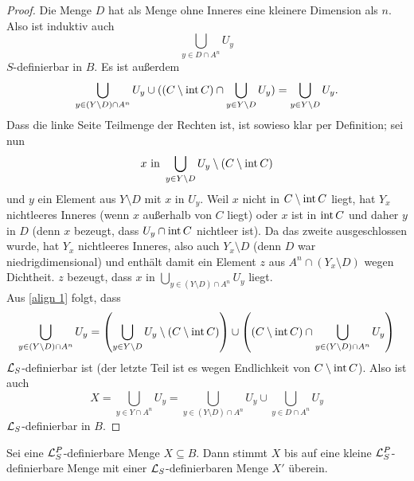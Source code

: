 \begin{proof}
	Die Menge $D$ hat als Menge ohne Inneres eine kleinere Dimension als $n$. Also ist induktiv auch $$\bigcup\limits_{y\in D\cap A^n}U_y$$ $S$-definierbar in $B$. Es ist außerdem
	\begin{align}\label{align 1}
	\bigcup\limits_{y\in (Y\setminus D)\cap A^n}U_y\cup((C\setminus\operatorname{int} C)\cap\bigcup\limits_{y\in Y\setminus D}U_y)=\bigcup\limits_{y\in Y\setminus D}U_y.
	\end{align}
	Dass die linke Seite Teilmenge der Rechten ist, ist sowieso klar per Definition; sei nun $$x\text{ in }\bigcup\limits_{y\in Y\setminus D}U_y\setminus (C\setminus\operatorname{int} C)$$ und $y$ ein Element aus $Y\setminus D$ mit $x$ in $U_y$. Weil $x$ nicht in $C\setminus\operatorname{int} C$ liegt, hat $Y_x$ nichtleeres Inneres (wenn $x$ außerhalb von $C$ liegt) oder $x$ ist in $\operatorname{int} C$ und daher $y$ in $D$ (denn $x$ bezeugt, dass $U_y\cap\operatorname{int} C$ nichtleer ist). Da das zweite ausgeschlossen wurde, hat $Y_x$ nichtleeres Inneres, also auch $Y_x\setminus D$ (denn $D$ war niedrigdimensional) und enthält damit ein Element $z$ aus $A^n\cap(Y_x\setminus D)$ wegen Dichtheit. $z$ bezeugt, dass $x$ in $\bigcup\limits_{y\in (Y\setminus D)\cap A^n}U_y$ liegt.\\
	Aus \ref{align 1} folgt, dass $$\bigcup\limits_{y\in (Y\setminus D)\cap A^n}U_y=\left(\bigcup\limits_{y\in Y\setminus D}U_y\setminus(C\setminus\operatorname{int} C)\right)\cup\left((C\setminus\operatorname{int} C)\cap\bigcup\limits_{y\in (Y\setminus D)\cap A^n}U_y\right)$$ $\mathcal{L}_S$-definierbar ist (der letzte Teil ist es wegen Endlichkeit von $C\setminus\operatorname{int} C$). Also ist auch $$X=\bigcup\limits_{y\in Y\cap A^n}U_y=\bigcup\limits_{y\in (Y\setminus D)\cap A^n}U_y\cup\bigcup\limits_{y\in D\cap A^n}U_y$$ $\mathcal{L}_S$-definierbar in $B$.
\end{proof}
\newpage
\begin{theorem}
	Sei eine $\mathcal{L}^P_S$-definierbare Menge $X\subseteq B$. Dann stimmt $X$ bis auf eine kleine $\mathcal{L}^P_S$-definierbare Menge mit einer $\mathcal{L}_S$-definierbaren Menge $X'$ überein.
\end{theorem}
